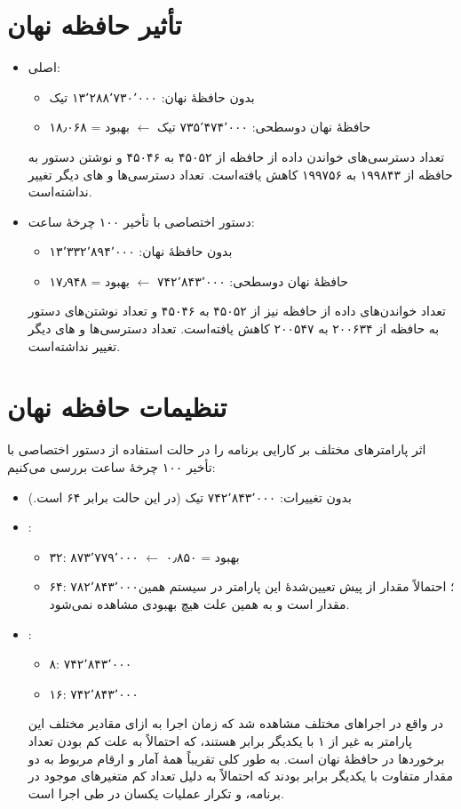 \documentclass[12pt,titlepage,a4page , tikz , multi,table , svgnames,xcdraw]{article}
\begin{document}
\section{تأثیر حافظه نهان}
\begin{itemize}
\item
{}
اصلی:
\begin{itemize}
\item
بدون حافظهٔ نهان: ۱۳٬۲۸۸٬۷۳۰٬۰۰۰ تیک
\item
حافظهٔ نهان دوسطحی: ۷۳۵٬۴۷۴٬۰۰۰ تیک
$\leftarrow$
بهبود = ۱۸٫۰۶۸
\end{itemize}
تعداد دسترسی‌های خواندن‌ داده از حافظه از ۴۵۰۵۲ به ۴۵۰۴۶ و نوشتن دستور به حافظه از ۱۹۹۸۴۳ به ۱۹۹۷۵۶ کاهش یافته‌است. تعداد دسترسی‌ها و
های
دیگر تغییر نداشته‌است.
\item
دستور اختصاصی با تأخیر ۱۰۰ چرخهٔ ساعت:
\begin{itemize}
\item
بدون حافظهٔ نهان: ۱۳٬۳۳۲٬۸۹۴٬۰۰۰
\item
حافظهٔ نهان دوسطحی: ۷۴۲٬۸۴۳٬۰۰۰
$\leftarrow$
بهبود = ۱۷٫۹۴۸
\end{itemize}
تعداد خواندن‌های داده از حافظه نیز از ۴۵۰۵۲ به ۴۵۰۴۶ و تعداد نوشتن‌های دستور به حافظه از ۲۰۰۶۳۴ به ۲۰۰۵۴۷ کاهش یافته‌است. تعداد دسترسی‌ها و
های
دیگر تغییر نداشته‌است.
\end{itemize}
\newpage
\section{تنظیمات حافظه نهان}
اثر پارامترهای مختلف بر کارایی برنامه را در حالت استفاده از دستور اختصاصی با تأخیر ۱۰۰ چرخهٔ ساعت بررسی می‌کنیم:
\begin{itemize}
\item
بدون تغییرات: ۷۴۲٬۸۴۳٬۰۰۰ تیک (در این حالت
برابر ۶۴ است.)
\item
{}:
\begin{itemize}
\item
۳۲: ۸۷۳٬۷۷۹٬۰۰۰
$\leftarrow$
بهبود = ۰٫۸۵۰
\item
۶۴: ۷۸۲٬۸۴۳٬۰۰۰؛
احتمالاً مقدار از پیش تعیین‌شدهٔ این پارامتر در سیستم همین مقدار است و به همین علت هیچ بهبودی مشاهده نمی‌شود.
\end{itemize}
\item
{}:
\begin{itemize}
\item
۸: ۷۴۲٬۸۴۳٬۰۰۰
\item
۱۶: ۷۴۲٬۸۴۳٬۰۰۰
\end{itemize}
در واقع در اجراهای مختلف مشاهده شد که زمان اجرا به ازای مقادیر مختلف این پارامتر به غیر از ۱ با یکدیگر برابر هستند، که احتمالاً به علت کم بودن تعداد برخوردها در حافظهٔ نهان است. به طور کلی تقریباً همهٔ آمار و ارقام مربوط به دو مقدار متفاوت
با یکدیگر برابر بودند که احتمالاً به دلیل تعداد کم متغیرهای موجود در برنامه، و تکرار عملیات یکسان در طی اجرا است.
\end{itemize}
\end{document}
